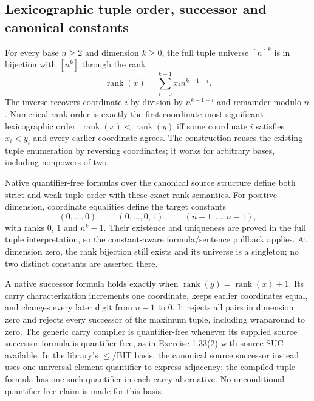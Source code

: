 \begin{result}
\subsection{Lexicographic tuple order, successor and canonical constants}
For every base $n\ge2$ and dimension $k\ge0$, the full tuple universe
$[n]^k$ is in bijection with $[n^k]$ through the rank
\[
  \operatorname{rank}(x)=\sum_{i=0}^{k-1}x_i n^{k-1-i}.
\]
The inverse recovers coordinate $i$ by division by $n^{k-1-i}$ and remainder
modulo $n$. Numerical rank order is exactly the first-coordinate-most-significant
lexicographic order: $\operatorname{rank}(x)<\operatorname{rank}(y)$ iff some
coordinate $i$ satisfies $x_i<y_i$ and every earlier coordinate agrees.
The construction reuses the existing tuple enumeration by reversing coordinates;
it works for arbitrary bases, including nonpowers of two.

Native quantifier-free formulas over the canonical source structure define both
strict and weak tuple order with these exact rank semantics. For positive dimension,
coordinate equalities define the target constants
\[
  (0,\ldots,0),\qquad (0,\ldots,0,1),\qquad (n-1,\ldots,n-1),
\]
with ranks $0$, $1$ and $n^k-1$. Their existence and uniqueness are proved in the
full tuple interpretation, so the constant-aware formula/sentence pullback applies.
At dimension zero, the rank bijection still exists and its universe is a singleton;
no two distinct constants are asserted there.

A native successor formula holds exactly when
$\operatorname{rank}(y)=\operatorname{rank}(x)+1$.
Its carry characterization increments one coordinate, keeps earlier coordinates equal,
and changes every later digit from $n-1$ to $0$. It rejects all pairs in dimension
zero and rejects every successor of the maximum tuple, including wraparound to zero.
The generic carry compiler is quantifier-free whenever its supplied source successor
formula is quantifier-free, as in Exercise 1.33(2) with source SUC available.
In the library's $\le$/BIT basis, the canonical source successor instead uses one
universal element quantifier to express adjacency; the compiled tuple formula has
one such quantifier in each carry alternative. No unconditional quantifier-free
claim is made for this basis.


\end{result}
